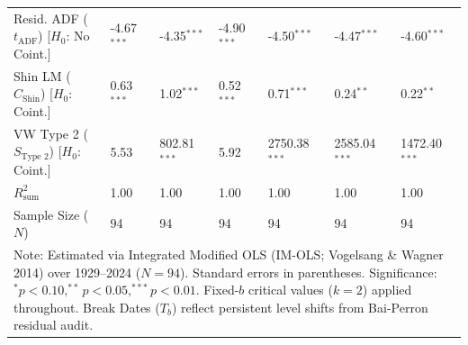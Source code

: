 \begin{table}[H]
\begin{tabular}{p{3.8cm}p{1.35cm}p{1.35cm}p{1.35cm}p{1.35cm}p{1.35cm}p{1.35cm}}
\makecell[l]{Resid. ADF ($t_{\text{ADF}}$) \\ {\scriptsize [$H_0$: No Coint.]}} & -4.67$^{***}$ & -4.35$^{***}$ & -4.90$^{***}$ & -4.50$^{***}$ & -4.47$^{***}$ & -4.60$^{***}$  \\
\makecell[l]{Shin LM ($C_{\text{Shin}}$) \\ {\scriptsize [$H_0$: Coint.]}} & 0.63$^{***}$ & 1.02$^{***}$ & 0.52$^{***}$ & 0.71$^{***}$ & 0.24$^{**}$ & 0.22$^{**}$  \\
\makecell[l]{VW Type 2 ($S_{\text{Type 2}}$) \\ {\scriptsize [$H_0$: Coint.]}} & 5.53 & 802.81$^{***}$ & 5.92 & 2750.38$^{***}$ & 2585.04$^{***}$ & 1472.40$^{***}$  \\
\midrule
$R^2_{\text{sum}}$ & 1.00 & 1.00 & 1.00 & 1.00 & 1.00 & 1.00  \\
Sample Size ($N$) & 94 & 94 & 94 & 94 & 94 & 94  \\
\bottomrule
\multicolumn{7}{p{13.2cm}}{\footnotesize Note: Estimated via Integrated Modified OLS (IM-OLS; Vogelsang \& Wagner 2014) over 1929--2024 ($N=94$). Standard errors in parentheses. Significance: $^*p<0.10, ^{**}p<0.05, ^{***}p<0.01$. Fixed-$b$ critical values ($k=2$) applied throughout. Break Dates ($T_b$) reflect persistent level shifts from Bai-Perron residual audit.}
\end{tabular}
\end{table}
